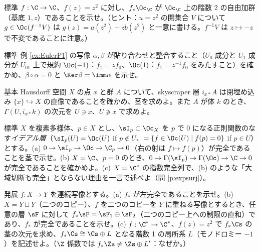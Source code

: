 \begin{prob}{標準}\label{p:pushO}
$f:\C\to\C$、$f(z)=z^2$ に対し、$f_*\Oc_{\C}$ が $\Oc_{\C}$ 上の階数 2 の自由加群（基底 $1,z$）であることを示せ。（ヒント：$u=z^2$ の開集合 $V$ について $g\in\Oc(f^{-1}V)$ は $g(z)=a(z^2)+zb(z^2)$ と一意に書ける。$f^{-1}V$ は $z\mapsto-z$ で不変であることに注意。）
\end{prob}
\begin{prob}{標準}\label{p:euler}
例 \ref{ex:EulerP1} の写像 $\alpha,\beta$ が貼り合わせと整合すること（$U_0$ 成分と $U_1$ 成分が $U_{01}$ 上で規約 $\Oc(-1)$：$f_1=zf_0$、$\Oc(1)$：$f_1=z^{-1}f_0$ をみたすこと）を確かめ、$\beta\circ\alpha=0$ と $\Ker\beta=\imm\alpha$ を示せ。
\end{prob}
\begin{prob}{基本}\label{p:skysc}
Hausdorff 空間 $X$ の点 $x$ と群 $A$ について、skyscraper 層 $i_{x*}A$ は閉埋め込み $\{x\}\hookrightarrow X$ の直像であることを確かめ、茎を求めよ。また $A$ が体 $k$ のとき、$\Gamma(U,i_{x*}k)$ の次元を $U\ni x$、$U\not\ni x$ で求めよ。
\end{prob}
\begin{prob}{標準}\label{p:idealseq}
$X$ を複素多様体、$p\in X$ とし、$\sI_p\subset\Oc_X$ を $p$ で $0$ になる正則関数のなす\emph{イデアル層}（$\sI_p(U)=\Oc(U)$ if $p\notin U$、$=\{f\in\Oc(U)\mid f(p)=0\}$ if $p\in U$）とする。(a) $0\to\sI_p\to\Oc\to\C_p\to0$（右の射は $f\mapsto f(p)$）が完全であることを茎で示せ。(b) $X=\C$、$p=0$ のとき、$0\to\Gamma(\sI_p)\to\Gamma(\Oc)\to\C\to0$ が完全であることを確かめよ。(c) $X=\C^*$ の指数完全列で、(b) のような「大域切断も完全」とならない理由を一言で述べよ（問 \ref{p:expsurj}）。
\end{prob}
\begin{prob}{発展}\label{p:fpush}
$f:X\to Y$ を連続写像とする。(a) $f_*$ が左完全であることを示せ。(b) $X=Y\sqcup Y$（二つのコピー）、$f$ を二つのコピーを $Y$ に重ねる写像とするとき、任意の層 $\sF$ に対して $f_*\sF=\sF_1\oplus\sF_2$（二つのコピー上への制限の直和）であり、$f_*$ が完全であることを示せ。(c) $f:\C^*\to\C^*$、$f(z)=z^2$ で $f_*\Cs$ の茎の次元を求め、$f_*\Cs\cong\Cs\oplus L$ となる階数 1 の局所系 $L$（モノドロミー $-1$）を記述せよ。（$\Z$ 係数では $f_*\Zs\ne\Zs\oplus L'$：なぜか。）
\end{prob}

